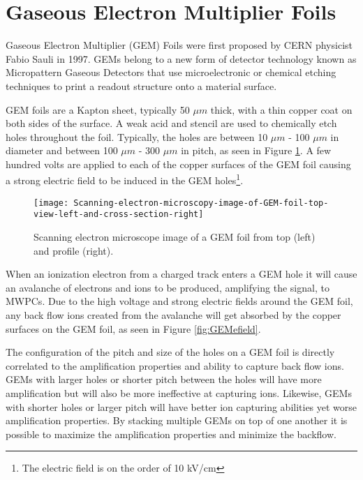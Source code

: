 \section{Gaseous Electron Multiplier Foils}
Gaseous Electron Multiplier (GEM) Foils were first proposed by CERN physicist Fabio Sauli in 1997\cite{Sauli:1997qp}.  GEMs belong to a new form of detector technology known as Micropattern Gaseous Detectors\cite{Titov:2013hmq} that use microelectronic or chemical etching techniques to print a readout structure onto a material surface.

GEM foils are a Kapton sheet, typically 50 $\mu m$ thick, with a thin copper coat on both sides of the surface.  A weak acid and stencil are used to chemically etch holes throughout the foil.  Typically, the holes are between 10 $\mu m$ - 100 $\mu m$ in diameter and between 100 $\mu m$ - 300 $\mu m$ in pitch, as seen in Figure \ref{fig:GEMpic}.  A few hundred volts are applied to each of the copper surfaces of the GEM foil causing a strong electric field to be induced in the GEM holes\footnote{The electric field is on the order of 10 kV/cm}.  

\begin{figure}[h]
\texttt{[image: Scanning-electron-microscopy-image-of-GEM-foil-top-view-left-and-cross-section-right]}
\centering
\caption{Scanning electron microscope image of a GEM foil from top (left) and profile (right)\cite{Brucken:2017qjy}.}
\label{fig:GEMpic}
\end{figure}

When an ionization electron from a charged track enters a GEM hole it will cause an avalanche of electrons and ions to be produced, amplifying the signal, to MWPCs.  Due to the high voltage and strong electric fields around the GEM foil, any back flow ions created from the avalanche will get absorbed by the copper surfaces on the GEM foil, as seen in Figure \ref{fig:GEMefield}.


The configuration of the pitch and size of the holes on a GEM foil is directly correlated to the amplification properties and ability to capture back flow ions.  GEMs with larger holes or shorter pitch between the holes will have more amplification but will also be more ineffective at capturing ions.  Likewise, GEMs with shorter holes or larger pitch will have better ion capturing abilities yet worse amplification properties.  By stacking multiple GEMs on top of one another it is possible to maximize the amplification properties and minimize the backflow. 


